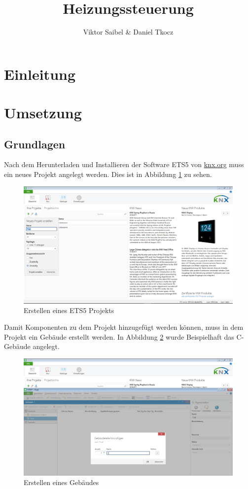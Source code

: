 \documentclass[a4paper]{article}
\begin{document}
\title{Heizungssteuerung}
\author{Viktor Saibel \& Daniel Tkocz}
\maketitle

\newpage

\tableofcontents

\newpage

\section{Einleitung}
\section{Umsetzung}
\subsection{Grundlagen}
Nach dem Herunterladen und Installieren der Software ETS5 von \href{https://www.knx.org/knx-de/software/ets/herunterladen/index.php}{knx.org} muss ein neues Projekt angelegt werden. Dies ist in Abbildung \ref{fig:1} zu sehen.

\begin{figure}[h!]
\centering
\includegraphics[width=13cm]{Doku/1}
\caption{Erstellen eines ETS5 Projekts}
\label{fig:1}
\end{figure}

Damit Komponenten zu dem Projekt hinzugefügt werden können, muss in dem Projekt ein Gebäude erstellt werden. In Abbildung \ref{fig:2} wurde Beispielhaft das C-Gebäude angelegt.

\begin{figure}[h!]
\centering
\includegraphics[width=13cm]{Doku/2}
\caption{Erstellen eines Gebäudes}
\label{fig:2}
\end{figure}
\end{document}

